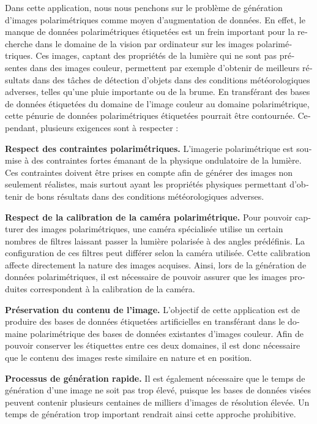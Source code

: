 \begin{otherlanguage}{french}
\quad Dans cette application, nous nous penchons sur le problème de génération d'images polarimétriques comme moyen d'augmentation de données. En effet, le manque de données polarimétriques étiquetées est un frein important pour la recherche dans le domaine de la vision par ordinateur sur les images polarimétriques. Ces images, captant des propriétés de la lumière qui ne sont pas présentes dans des images couleur, permettent par exemple d'obtenir de meilleurs résultats dans des tâches de détection d'objets dans des conditions météorologiques adverses, telles qu'une pluie importante ou de la brume. En transférant des bases de données étiquetées du domaine de l'image couleur au domaine polarimétrique, cette pénurie de données polarimétriques étiquetées pourrait être  contournée. Cependant, plusieurs exigences sont à respecter :

\textbf{Respect des contraintes polarimétriques.} L'imagerie polarimétrique est soumise à des contraintes fortes émanant de la physique ondulatoire de la lumière. Ces contraintes doivent être prises en compte afin de générer des images non seulement réalistes, mais surtout ayant les  propriétés physiques permettant d'obtenir de bons résultats dans des conditions météorologiques adverses.

\textbf{Respect de la calibration de la caméra polarimétrique.} Pour pouvoir capturer des images polarimétriques, une caméra spécialisée utilise un certain nombres de filtres laissant passer la lumière polarisée à des angles prédéfinis. La configuration de ces filtres peut différer selon la caméra utilisée. Cette calibration affecte directement la nature des images acquises. Ainsi, lors de la génération de données polarimétriques, il est nécessaire de pouvoir assurer que les images produites correspondent à la calibration de la caméra.

\textbf{Préservation du contenu de l'image.} L'objectif de cette application est de produire des bases de données étiquetées artificielles en transférant dans le domaine polarimétrique des bases de données existantes d'images couleur. Afin de pouvoir conserver les étiquettes entre ces deux domaines, il est donc nécessaire que le contenu des images reste similaire en nature et en position.

\textbf{Processus de génération rapide.} Il est également nécessaire que le temps de génération d'une image ne soit pas trop élevé, puisque les bases de données visées peuvent contenir plusieurs centaines de milliers d'images de résolution élevée. Un temps de génération trop important rendrait ainsi cette approche prohibitive.



\end{otherlanguage}
